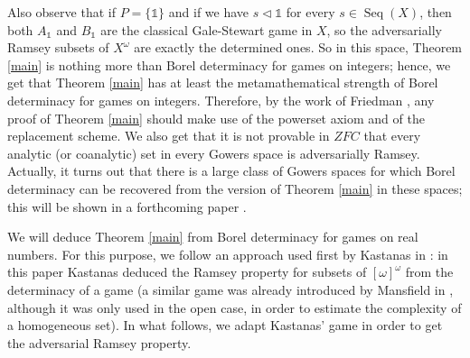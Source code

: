 \documentclass[a4paper,11pt]{article}
\theoremstyle{definition}
\numberwithin{equation}{section}
\newcommand{\elinf}{[\omega]^\omega}
\DeclareMathOperator{\Seq}{Seq}
\begin{document}
\smallskip

Also observe that if $P = \{\mathds{1}\}$ and if we have $s \vartriangleleft \mathds{1}$ for every $s \in \Seq(X)$, then both $A_\mathds{1}$ and $B_\mathds{1}$ are the classical Gale-Stewart game in $X$, so the adversarially Ramsey subsets of $X^\omega$ are exactly the determined ones. So in this space, Theorem \ref{main} is nothing more than Borel determinacy for games on integers; hence, we get that Theorem \ref{main} has at least the metamathematical strength of Borel determinacy for games on integers. Therefore, by the work of Friedman \cite{Friedman}, any proof of Theorem \ref{main} should make use of the powerset axiom and of the replacement scheme. We also get that it is not provable in $ZFC$ that every analytic (or coanalytic) set in every Gowers space is adversarially Ramsey. Actually, it turns out that there is a large class of Gowers spaces for which Borel determinacy can be recovered from the version of Theorem \ref{main} in these spaces; this will be shown in a forthcoming paper \nolinebreak \cite{RancourtRamseyII}.

\smallskip

We will deduce Theorem \ref{main} from Borel determinacy for games on real numbers. For this purpose, we follow an approach used first by Kastanas in \cite{kastanas}: in this paper Kastanas deduced the Ramsey property for subsets of $\elinf$ from the determinacy of a game %
(a similar game was already introduced by Mansfield in \cite{Mansfield}, although it was only used in the open case, in order to estimate the complexity of a homogeneous set). In what follows, we adapt Kastanas' game in order to get the adversarial Ramsey property.
\end{document}
